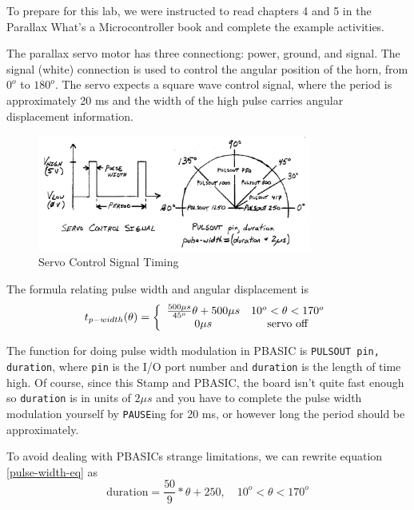 \documentclass[11pt]{article}
\begin{document}
To prepare for this lab, we were instructed to read chapters 4 and 5 in the Parallax What's a Microcontroller book and complete the example activities.

The parallax servo motor has three connectiong: power, ground, and signal.
The signal (white) connection is used to control the angular position of
the horn, from $0^{o}$ to $180^{o}$.
The servo expects a square wave control signal,
where the period is approximately 20 ms
and the width of the high pulse carries angular displacement information.

\begin{figure}[h!]
\centering
\includegraphics[width=0.8\textwidth]{pulse-width-vs-angular-displacement.pdf}
\caption{Servo Control Signal Timing}
\label{pulse-width-vs-angular-displacement}
\end{figure}

The formula relating pulse width and angular displacement is
\begin{equation}
t_{p-width}(\theta)=\left\{\begin{array}{c c}
\frac{500\mu s}{45^{o}}\theta+500\mu s	&	10^{o}<\theta<170^{o}\\
0\mu s	&	\textrm{servo off}	\\
\end{array}\right.
\label{pulse-width-eq}
\end{equation}

The function for doing pulse width modulation in PBASIC is
\texttt{PULSOUT pin, duration}, where \texttt{pin} is the
I/O port number and \texttt{duration} is the length of time high.
Of course, since this Stamp and PBASIC, the board isn't quite
fast enough so \texttt{duration} is in units of $2\mu s$ and
you have to complete the pulse width modulation yourself by
\texttt{PAUSE}ing for 20 ms, or however long the period should
be approximately.

To avoid dealing with PBASICs strange limitations,
we can rewrite equation \ref{pulse-width-eq} as
\begin{equation}
\textrm{duration}=\frac{50}{9}*\theta+250, \quad 10^{o}<\theta<170^{o}
\label{duration-eq}
\end{equation}
\end{document}
